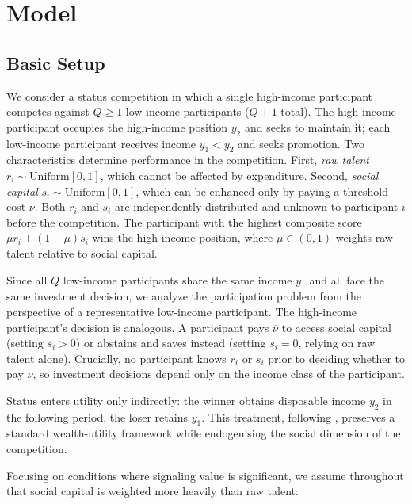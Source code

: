 \documentclass[
    oneside,
    fontsize=10pt,leqno]{article}
\begin{document}
\section{\label{sec:Theoretical_chapter_Model}Model}

\subsection{Basic Setup}

\noindent

We consider a status competition in which a single high-income participant competes against $Q\geq1$ low-income participants ($Q+1$ total).
The high-income participant occupies the high-income position $y_{2}$ and
seeks to maintain it; each low-income participant receives income $y_{1}<y_{2}$
and seeks promotion. Two characteristics determine performance in
the competition. First, \emph{raw talent} $r_{i}\sim\mathrm{Uniform}[0,1]$,
which cannot be affected by expenditure. Second, \emph{social capital}
$s_{i}\sim\mathrm{Uniform}[0,1]$, which can be enhanced only by paying
a threshold cost $\overline{\nu}$. Both $r_{i}$ and $s_{i}$ are
independently distributed and unknown to participant $i$ before the
competition. The participant with the highest composite score $\mu
r_{i}+(1-\mu)s_{i}$ wins the high-income position, where $\mu\in(0,1)$
weights raw talent relative to social capital.

Since all $Q$ low-income participants share the same income $y_{1}$ and
all face the same investment decision, we analyze the participation
problem from the perspective of a representative low-income participant.
The high-income participant's decision is analogous. A participant pays
$\overline{\nu}$ to access social capital (setting $s_{i}>0$) or
abstains and saves instead (setting $s_{i}=0$, relying on raw talent
alone). Crucially, no participant knows $r_{i}$ or $s_{i}$ prior
to deciding whether to pay $\overline{\nu}$, so investment decisions
depend only on the income class of the participant.

Status enters utility only indirectly: the winner obtains disposable
income $y_{2}$ in the following period, the loser retains $y_{1}$.
This treatment, following \citet{postlewaite1998socialbasisinterdeppreferences},
preserves a standard wealth-utility framework while endogenising the
social dimension of the competition.

Focusing on conditions where signaling value is significant, we assume
throughout that social capital is weighted more heavily than raw talent:
\end{document}
